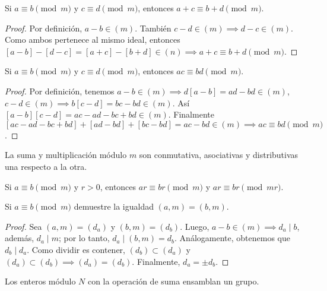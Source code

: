 \documentclass[main.tex]{subfiles}
\begin{document}
\begin{lemma}
    Si $a \equiv b \pmod{m}$ y $c \equiv d \pmod{m}$, entonces $a + c \equiv b + d \pmod{m}$.
\end{lemma}

\begin{proof}
    Por definici\'on, $a - b \in (m)$. Tambi\'en $c - d \in (m) \implies d - c \in (m)$. Como ambos pertenece al mismo ideal, entonces $[a - b] - [d - c] = [a + c] - [b + d]\in (n) \implies a + c \equiv b + d \pmod{m}$.
\end{proof}

\begin{lemma}
    Si $a \equiv b \pmod{m}$ y $c \equiv d \pmod{m}$, entonces $ac \equiv bd \pmod{m}$.
\end{lemma}

\begin{proof}
    Por definici\'on, tenemos $a - b \in (m) \implies d[a - b] = ad - bd \in (m)$, $c - d \in (m) \implies b[c - d] = bc - bd \in (m)$. As\'i $[a - b][c - d] = ac - ad - bc + bd \in (m)$. Finalmente $[ac - ad - bc + bd] + [ad - bd] + [bc - bd] = ac - bd \in (m) \implies ac \equiv bd \pmod{m}$.
\end{proof}

\begin{lemma}
    La suma y multiplicaci\'on m\'odulo $m$ son conmutativa, asociativas y distributivas una respecto a la otra.
\end{lemma}

\begin{remark}
    Si $a \equiv b \pmod{m}$ y $r > 0$, entonces $ar \equiv br \pmod{m}$ y $ar \equiv br \pmod{mr}$.
\end{remark}

\begin{theorem}
    Si $a \equiv b \pmod{m}$ demuestre la igualdad $(a, m) = (b, m)$.
\end{theorem}

\begin{proof}
    Sea $(a, m) = (d_a)$ y $(b, m) = (d_b)$. Luego, $a - b \in (m) \implies d_a \mid b$, adem\'as, $d_a \mid m$; por lo tanto, $d_a \mid (b, m) = d_b$. An\'alogamente, obtenemos que $d_b \mid d_a$. Como dividir es contener, $(d_b) \subset (d_a)$ y $(d_a) \subset (d_b) \implies (d_a) = (d_b)$. Finalmente, $d_a = \pm d_b$.
\end{proof}

\begin{lemma}
    Los enteros m\'odulo $N$ con la operaci\'on de suma ensamblan un grupo.
\end{lemma}
\end{document}
